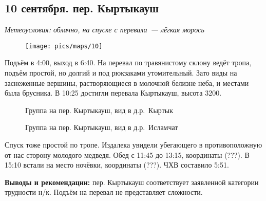 \subsection{10 сентября. пер. Кыртыкауш}
\textit{Метеоусловия: облачно, на спуске с перевала~--- лёгкая морось}

\begin{figure}[h!]
	\centering
	\texttt{[image: pics/maps/10]}
	\label{fig:10}
\end{figure}


Подъём в 4:00, выход в 6:40. На перевал по травянистому склону ведёт тропа, подъём простой, но долгий и под рюкзаками утомительный. Зато виды на заснеженные вершины, растворяющиеся в молочной белизне неба, и местами была брусника. В 10:25 достигли перевала Кыртыкауш, высота 3200.

\begin{figure}[h!]
	\centering
	\caption{Группа на пер. Кыртыкауш, вид в д.р.~Кыртык}
	\label{fig:kyrtyk1}
\end{figure}

\begin{figure}[h!]
	\centering
	\caption{Группа на пер. Кыртыкауш, вид в д.р.~Исламчат}
	\label{fig:kyrtyk2}
\end{figure}


Спуск тоже простой по тропе. Издалека увидели убегающего в противоположную от нас сторону молодого медведя. Обед с 11:45 до 13:15, координаты (???). В 15:10 встали на место ночёвки, координаты (???). ЧХВ составило 5:51.



\textbf{Выводы и рекомендации:} пер. Кыртыкауш соответствует заявленной категории трудности н/к.  Подъём на перевал не представляет сложности. 






\clearpage
